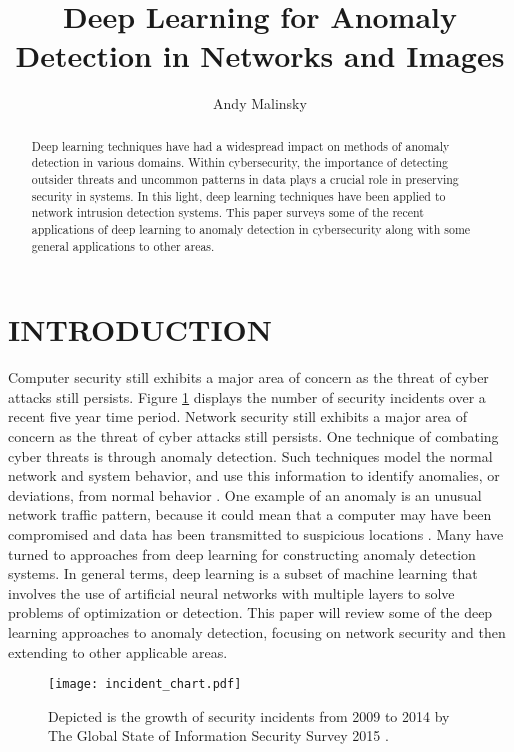 \documentclass[letterpaper, 10 pt, conference]{ieeeconf}
\title{\LARGE \bf Deep Learning for Anomaly Detection in Networks and Images}
\author{Andy Malinsky}%
\begin{document}
\maketitle
\thispagestyle{empty}
\pagestyle{empty}

\begin{abstract}
Deep learning techniques have had a widespread impact on methods of anomaly detection in various domains. Within cybersecurity, the importance of detecting outsider threats and uncommon patterns in data plays a crucial role in preserving security in systems. In this light, deep learning techniques have been applied to network intrusion detection systems. This paper surveys some of the recent applications of deep learning to anomaly detection in cybersecurity along with some general applications to other areas.
\end{abstract}
\hfill

\section{INTRODUCTION}
Computer security still exhibits a major area of concern as the threat of cyber attacks still persists. Figure \ref{incident_chart} displays the number of security incidents over a recent five year time period. Network security still exhibits a major area of concern as the threat of cyber attacks still persists. One technique of combating cyber threats is through anomaly detection. Such techniques model the normal network and system behavior, and use this information to identify anomalies, or deviations, from normal behavior \cite{c1}. One example of an anomaly is an unusual network traffic pattern, because it could mean that a computer may have been compromised and data has been transmitted to suspicious locations \cite{c7}. Many have turned to approaches from deep learning for constructing anomaly detection systems. In general terms, deep learning is a subset of machine learning that involves the use of artificial neural networks with multiple layers to solve problems of optimization or detection. This paper will review some of the deep learning approaches to anomaly detection, focusing on network security and then extending to other applicable areas.

\begin{figure}[ht!] %
\centering
\hspace*{-5.1cm}
\texttt{[image: incident\_chart.pdf]}
\vspace*{-35mm}
\caption{Depicted is the growth of security incidents from 2009 to 2014 by The Global State of Information Security Survey 2015 \cite{c7, c11}.}
\label{incident_chart}
\end{figure}
\end{document}
